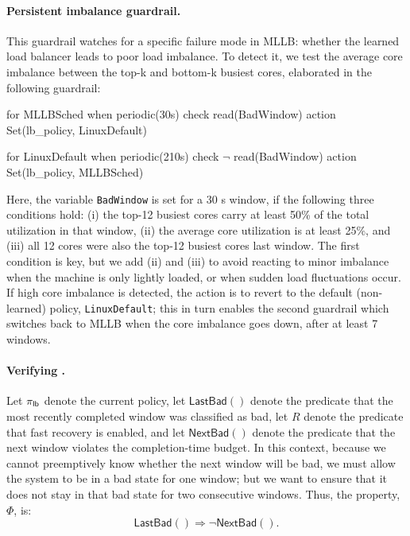 \paragraph{Persistent imbalance guardrail.}
This guardrail watches for a specific failure mode in MLLB: whether the learned load balancer leads to poor load imbalance. To detect it, we test the average core imbalance between the top-k and bottom-k busiest cores, elaborated in the following guardrail:
\begin{dslbox}[title={Guardrail~\theguardcount: Persistent imbalance in learned load balancing}, glabel=lst:mllb]
for MLLBSched
when periodic(30s)
check read(BadWindow)
action Set(lb_policy, LinuxDefault)

for LinuxDefault
when periodic(210s)
check $\neg$ read(BadWindow)
action Set(lb_policy, MLLBSched)
\end{dslbox}
Here, the variable {\tt BadWindow} is set for a 30 s window, if the following three conditions hold:
(i) the top-12 busiest cores carry at least 50\% of the total utilization in that window, 
(ii) the average core utilization is at least 25\%, and (iii) all 12 cores were also the top-12 busiest cores last window.
The first condition is key, but we add (ii) and (iii) to avoid reacting to minor imbalance when the machine is only lightly loaded, or when sudden load fluctuations occur.
If high core imbalance is detected, the action is to revert to the default (non-learned) policy, {\tt LinuxDefault}; this in turn enables the second guardrail which switches back to MLLB when the core imbalance goes down, after at least 7 windows.

\paragraph{Verifying \perfsafety.}
Let $\pi_{\mathsf{lb}}$ denote the current policy, let $\mathsf{LastBad}()$ denote the predicate that the most recently completed window was classified as bad, let $R$ denote the predicate that fast recovery is enabled, and let $\mathsf{NextBad}()$ denote the predicate that the next window violates the completion-time budget. 
In this context, because we cannot preemptively know whether the next window will be bad, we must allow the system to be in a bad state for one window; but we want to ensure that it does not stay in that bad state for two consecutive windows. Thus, the \perfsafety{} property, $\Phi$, is:
\[
\mathsf{LastBad}() \Rightarrow \neg \mathsf{NextBad}().
\]

